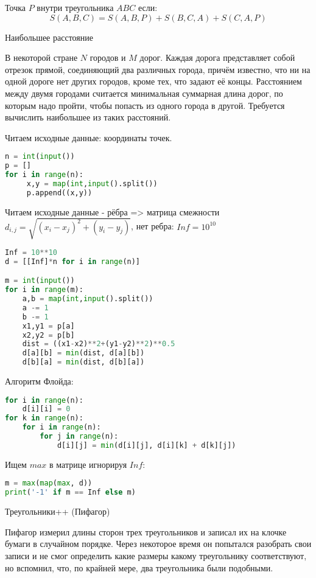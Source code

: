 \documentclass[a4paper,notitlepage,11pt]{article}
\begin{document}
Точка $P$ внутри треугольника $ABC$ если:
$$S(A,B,C) = S(A,B,P) + S(B,C,A) + S(C,A,P)$$

\centerline{\Huge Наибольшее расстояние}

 В некоторой стране $N$ городов и $M$ дорог. Каждая дорога представляет собой
 отрезок прямой, соединяющий два различных города, причём известно, что ни
 на одной дороге нет других городов, кроме тех, что задают её концы.
 Расстоянием между двумя городами считается минимальная суммарная длина дорог,
 по которым надо пройти, чтобы попасть из одного города в другой.
 Требуется вычислить наибольшее из таких расстояний.

Читаем исходные данные: координаты точек.

\begin{lstlisting}[language=Python]
n = int(input())
p = [] 
for i in range(n):
     x,y = map(int,input().split())
     p.append((x,y))
\end{lstlisting}

Читаем исходные данные - рёбра => матрица смежности $d_{i,j} = \sqrt{(x_i - x_j)^2 + (y_i - y_j)}$, нет ребра: $Inf = 10^{10}$
    
\begin{lstlisting}[language=Python]
Inf = 10**10
d = [[Inf]*n for i in range(n)]

m = int(input())        
for i in range(m):
    a,b = map(int,input().split())
    a -= 1
    b -= 1
    x1,y1 = p[a]
    x2,y2 = p[b]
    dist = ((x1-x2)**2+(y1-y2)**2)**0.5
    d[a][b] = min(dist, d[a][b])
    d[b][a] = min(dist, d[b][a])   
\end{lstlisting}

Алгоритм Флойда:

\begin{lstlisting}[language=Python]
for i in range(n):
    d[i][i] = 0    
for k in range(n):
    for i in range(n):
        for j in range(n):
            d[i][j] = min(d[i][j], d[i][k] + d[k][j])
\end{lstlisting}

Ищем $max$ в матрице игнорируя $Inf$:

\begin{lstlisting}[language=Python]
m = max(map(max, d))
print('-1' if m == Inf else m)
\end{lstlisting}

\centerline{\Huge Треугольники++ (Пифагор)}

Пифагор измерил длины сторон трех треугольников и записал их на клочке бумаги в случайном порядке. 
Через некоторое время он попытался разобрать свои записи и не смог 
определить какие размеры какому треугольнику соответствуют, но вспомнил, что, 
по крайней мере, два треугольника были подобными.
\end{document}
